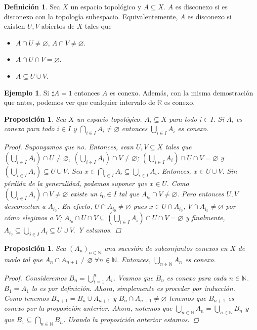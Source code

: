 \documentclass[12pt]{book}
\newtheorem{prop}[teo]{Proposición}
\theoremstyle{definition}
\newtheorem{defn}[teo]{Definición}
\newtheorem{ex}[teo]{Ejemplo}
\newcommand{\RR}{\mathbb{R}}      %
\newcommand{\NN}{\mathbb{N}}
\let\emptyset\varnothing
\begin{document}
\begin{defn}
Sea $X$ un espacio topológico y $A\subseteq X$. $A$ es disconexo si es disconexo con la topología subespacio. Equivalentemente, $A$ es disconexo si existen $U,V$ abiertos de $X$ tales que \begin{itemize}\item $A\cap U\neq \emptyset$, $A\cap V\neq\emptyset$. \item $A\cap U\cap V = \emptyset$. \item $A\subseteq U\cup V$. \end{itemize}
\end{defn}

\begin{ex}
Si $\sharp A=1$ entonces $A$ es conexo. Además, con la misma demostración que antes, podemos ver que cualquier intervalo de $\RR$ es conexo.
\end{ex}

\begin{prop}
Sea $X$ un espacio topológico. $A_i\subseteq X$ para todo $i\in I$. Si $A_i$ es conexo para todo $i\in I$ y $\displaystyle\bigcap_{i\in I}A_i \neq \emptyset$ entonces $\displaystyle\bigcup_{i\in I}A_i$ es conexo.
\begin{proof}
Supongamos que no. Entonces, sean $U,V\subseteq X$ tales que $\left(\displaystyle\bigcup_{i\in I} A_i\right)\cap U\neq \emptyset$, $\left(\displaystyle\bigcup_{i\in I} A_i\right)\cap V\neq \emptyset$; $\left(\displaystyle\bigcup_{i\in I} A_i\right)\cap U\cap V = \emptyset$ y $\left(\displaystyle\bigcup_{i\in I} A_i\right)\subseteq U\cup V$. Sea $x\in\displaystyle\bigcap_{i\in I}A_i\subseteq \displaystyle\bigcup_{i\in I}A_i$. Entonces, $x\in U\cup V$. Sin pérdida de la generalidad, podemos suponer que $x\in U$. Como $\left(\displaystyle\bigcup_{i\in I}A_i\right)\cap V\neq\emptyset$ existe un $i_0\in I$ tal que $A_{i_0}\cap V\neq\emptyset$. Pero entonces $U,V$ desconectan a $A_{i_0}$. En efecto, $U\cap A_{i_0}\neq \emptyset$ pues $x\in U\cap A_{i_0}$, $V\cap A_{i_0}\neq\emptyset$ por cómo elegimos a $V$; $A_{i_0}\cap U\cap V\subseteq \left( \displaystyle\bigcup_{i\in I}A_i\right) \cap U\cap V = \emptyset$ y finalmente, $A_{i_0}\subseteq \displaystyle\bigcup_{i\in I}A_i\subseteq U\cup V$. Y estamos.
\end{proof}
\end{prop}

\begin{prop}
Sea $(A_n)_{n\in\NN}$ una sucesión de subconjuntos conexos en $X$ de modo tal que $A_n\cap A_{n+1}\neq\emptyset \;\forall n\in \NN$. Entonces, $\displaystyle\bigcup_{n\in\NN} A_n$ es conexo.
\begin{proof}
Consideremos $B_n = \displaystyle\bigcup_{i=1}^n A_i$. Veamos que $B_n$ es conexo para cada $n\in\NN$. $B_1 = A_1$ lo es por definición. Ahora, simplemente es proceder por inducción. Como tenemos $B_{n+1} = B_n \cup A_{n+1}$ y $B_n\cap A_{n+1}\neq \emptyset$ tenemos que $B_{n+1}$ es conexo por la proposición anterior. Ahora, notemos que $\displaystyle\bigcup_{n\in\NN} A_n = \displaystyle\bigcup_{n\in\NN} B_n$ y que $B_1\subseteq \displaystyle\bigcap_{n\in\NN} B_n$. Usando la proposición anterior estamos.
\end{proof} 
\end{prop}
\end{document}
